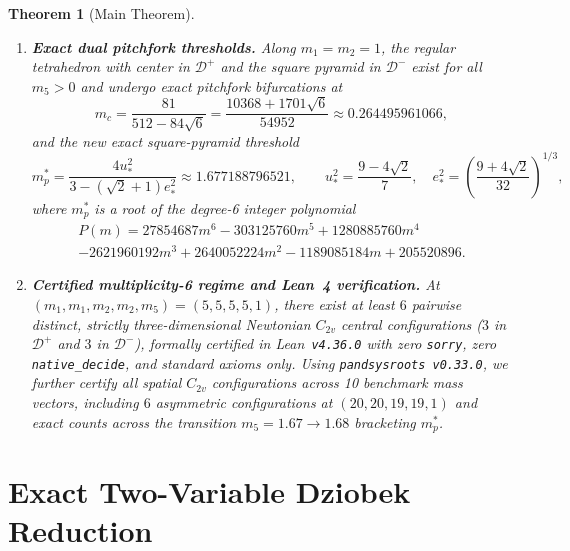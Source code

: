 \documentclass[11pt,a4paper]{amsart}
\newtheorem{theorem}{Theorem}[section]
\theoremstyle{definition}
\theoremstyle{remark}
\begin{document}
\begin{theorem}[Main Theorem]
\begin{enumerate}[label=\textup{(\arabic*)}]
        exceptional curves $m_1^2 = 2 m_2 m_5$ and $2 m_2 = 2 m_1 + m_5$.
  \item \textbf{Exact dual pitchfork thresholds.}
        Along $m_1 = m_2 = 1$, the regular tetrahedron with center in $\mathcal{D}^+$
        and the square pyramid in $\mathcal{D}^-$ exist for all $m_5 > 0$ and undergo
        exact pitchfork bifurcations at
        \[
          m_c = \frac{81}{512 - 84\sqrt{6}} = \frac{10368 + 1701\sqrt{6}}{54952}
          \approx 0.264495961066,
        \]
        and the new exact square-pyramid threshold
        \[
          m_p^* = \frac{4 u_*^2}{3 - (\sqrt{2}+1) e_*^2} \approx 1.677188796521,
          \qquad u_*^2 = \frac{9 - 4\sqrt{2}}{7}, \quad
          e_*^2 = \left(\frac{9 + 4\sqrt{2}}{32}\right)^{1/3},
        \]
        where $m_p^*$ is a root of the degree-6 integer polynomial
        \begin{multline*}
          P(m) = 27854687 m^6 - 303125760 m^5 + 1280885760 m^4 \\
                 - 2621960192 m^3 + 2640052224 m^2 - 1189085184 m + 205520896.
        \end{multline*}
  \item \textbf{Certified multiplicity-6 regime and Lean~4 verification.}
        At $(m_1, m_1, m_2, m_2, m_5) = (5,5,5,5,1)$, there exist at least $6$ pairwise
        distinct, strictly three-dimensional Newtonian $C_{2v}$ central configurations
        ($3$ in $\mathcal{D}^+$ and $3$ in $\mathcal{D}^-$), formally certified in
        Lean~\texttt{v4.36.0} with zero \texttt{sorry}, zero \texttt{native\_decide},
        and standard axioms only. Using \texttt{pandsysroots v0.33.0}, we further
        certify all spatial $C_{2v}$ configurations across 10 benchmark mass vectors,
        including $6$ asymmetric configurations at $(20,20,19,19,1)$ and exact counts
        across the transition $m_5 = 1.67 \to 1.68$ bracketing $m_p^*$.
\end{enumerate}
\end{theorem}

\section{Exact Two-Variable Dziobek Reduction}
\end{document}
